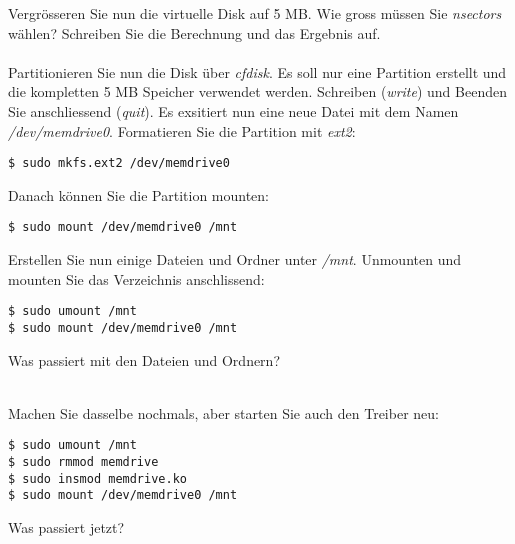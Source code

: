 Vergrösseren Sie nun die virtuelle Disk auf 5 MB. Wie gross müssen Sie \emph{nsectors} wählen?
Schreiben Sie die Berechnung und das Ergebnis auf. \\


\underline{\hspace{\textwidth}} \\

Partitionieren Sie nun die Disk über \emph{cfdisk}. Es soll nur eine Partition erstellt und die kompletten
5 MB Speicher verwendet werden. Schreiben (\emph{write}) und Beenden Sie anschliessend (\emph{quit}). Es exsitiert nun eine
neue Datei mit dem Namen \emph{/dev/memdrive0}. Formatieren Sie die Partition mit \emph{ext2}:
\begin{lstlisting}
$ sudo mkfs.ext2 /dev/memdrive0
\end{lstlisting}

Danach können Sie die Partition mounten:
\begin{lstlisting}
$ sudo mount /dev/memdrive0 /mnt
\end{lstlisting}

Erstellen Sie nun einige Dateien und Ordner unter \emph{/mnt}. Unmounten und mounten Sie das Verzeichnis anschlissend:
\begin{lstlisting}
$ sudo umount /mnt
$ sudo mount /dev/memdrive0 /mnt
\end{lstlisting}

Was passiert mit den Dateien und Ordnern?

\underline{\hspace{\textwidth}} \\

Machen Sie dasselbe nochmals, aber starten Sie auch den Treiber neu:
\begin{lstlisting}
$ sudo umount /mnt
$ sudo rmmod memdrive
$ sudo insmod memdrive.ko
$ sudo mount /dev/memdrive0 /mnt
\end{lstlisting}

Was passiert jetzt?

\underline{\hspace{\textwidth}} \\
